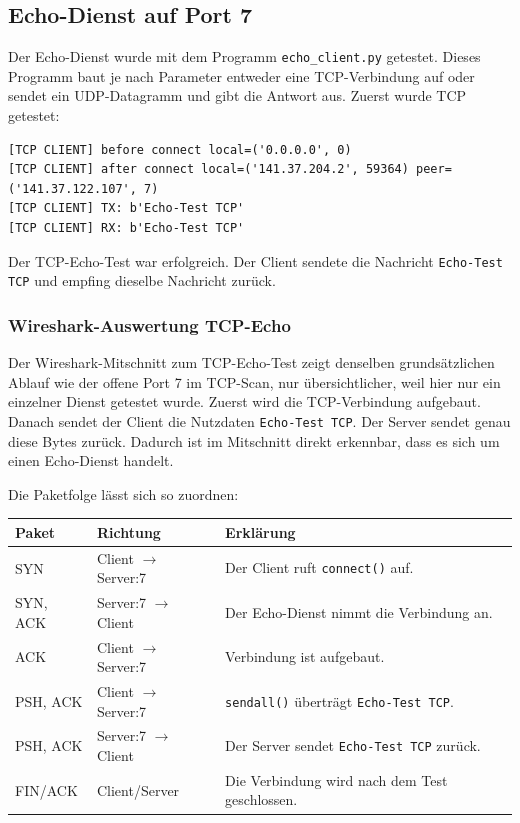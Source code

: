 \documentclass{kdiartcl}
\begin{document}
\subsection{Echo-Dienst auf Port 7}

Der Echo-Dienst wurde mit dem Programm \texttt{echo\_client.py} getestet. Dieses Programm baut je nach Parameter entweder eine TCP-Verbindung auf oder sendet ein UDP-Datagramm und gibt die Antwort aus. Zuerst wurde TCP getestet:

\begin{verbatim}
[TCP CLIENT] before connect local=('0.0.0.0', 0)
[TCP CLIENT] after connect local=('141.37.204.2', 59364) peer=('141.37.122.107', 7)
[TCP CLIENT] TX: b'Echo-Test TCP'
[TCP CLIENT] RX: b'Echo-Test TCP'
\end{verbatim}

Der TCP-Echo-Test war erfolgreich. Der Client sendete die Nachricht \texttt{Echo-Test TCP} und empfing dieselbe Nachricht zurück.

\subsubsection{Wireshark-Auswertung TCP-Echo}

Der Wireshark-Mitschnitt zum TCP-Echo-Test zeigt denselben grundsätzlichen Ablauf wie der offene Port 7 im TCP-Scan, nur übersichtlicher, weil hier nur ein einzelner Dienst getestet wurde. Zuerst wird die TCP-Verbindung aufgebaut. Danach sendet der Client die Nutzdaten \texttt{Echo-Test TCP}. Der Server sendet genau diese Bytes zurück. Dadurch ist im Mitschnitt direkt erkennbar, dass es sich um einen Echo-Dienst handelt.

Die Paketfolge lässt sich so zuordnen:

\begin{center}
\small
\begin{tabularx}{\textwidth}{|l|l|Y|}
\hline
\textbf{Paket} & \textbf{Richtung} & \textbf{Erklärung} \\
\hline
SYN & Client $\rightarrow$ Server:7 & Der Client ruft \texttt{connect()} auf. \\
\hline
SYN, ACK & Server:7 $\rightarrow$ Client & Der Echo-Dienst nimmt die Verbindung an. \\
\hline
ACK & Client $\rightarrow$ Server:7 & Verbindung ist aufgebaut. \\
\hline
PSH, ACK & Client $\rightarrow$ Server:7 & \texttt{sendall()} überträgt \texttt{Echo-Test TCP}. \\
\hline
PSH, ACK & Server:7 $\rightarrow$ Client & Der Server sendet \texttt{Echo-Test TCP} zurück. \\
\hline
FIN/ACK & Client/Server & Die Verbindung wird nach dem Test geschlossen. \\
\hline
\end{tabularx}
\end{center}
\end{document}
